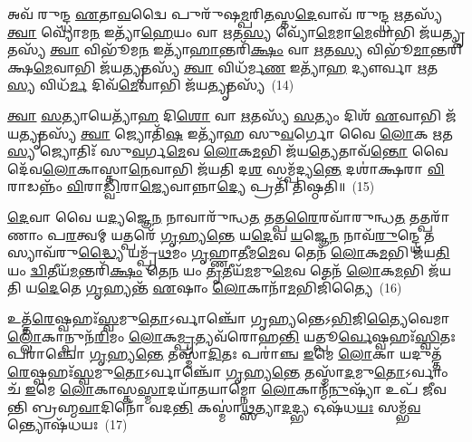 𑌅𑌵᳴ 𑌰𑍁𑌨𑍍𑌦𑍍𑌧 \ul{𑌏}\-𑌤𑌾\-\ul{𑌵}\-𑌦𑍍𑌵𑍈 𑌪𑍁𑌰𑍁᳴𑌷\-\ul{𑌮𑍍𑌪}\-𑌰𑌿\-\ul{𑌤}\-𑌸𑍍𑌤\-\ul{𑌦𑍇}\-𑌵𑌾𑌵᳴ 𑌰𑍁𑌨𑍍𑌦𑍍𑌧 \ul{𑌋}\-𑌤𑌸𑍍𑌯᳴ \ul{𑌤𑍍𑌵𑌾} 𑌵𑍍𑌯𑍋᳴𑌮\-\ul{𑌨} 𑌇𑌤𑍍𑌯𑌾᳴\-\ul{𑌹𑍇}\-𑌯𑌂 𑌵𑌾 \ul{𑌋}\-𑌤\-\ul{𑌸𑍍𑌯} 𑌵𑍍𑌯𑍋᳴\-\ul{𑌮𑍇}\-𑌮𑌾\-\ul{𑌮𑍇}\-𑌵𑌾𑌭𑌿 𑌜᳴𑌯\-\ul{𑌤𑍍𑌯𑍃}\-𑌤𑌸𑍍𑌯᳴ \ul{𑌤𑍍𑌵𑌾} 𑌵𑌿𑌭𑍂᳴𑌮\-\ul{𑌨} 𑌇𑌤𑍍𑌯𑌾᳴\-\ul{𑌹𑌾}\-𑌨𑍍𑌤𑌰𑌿᳴\-\ul{𑌕𑍍𑌷𑌂} 𑌵𑌾 \ul{𑌋}\-𑌤\-\ul{𑌸𑍍𑌯} 𑌵𑌿𑌭𑍂᳴\-\ul{𑌮𑌾}\-𑌨𑍍𑌤𑌰𑌿᳴𑌕𑍍𑌷\-\ul{𑌮𑍇}\-𑌵𑌾𑌭𑌿 𑌜᳴𑌯\-\ul{𑌤𑍍𑌯𑍃}\-𑌤𑌸𑍍𑌯᳴ \ul{𑌤𑍍𑌵𑌾} 𑌵𑌿𑌧᳴𑌰𑍍𑌮\-\ul{𑌣} 𑌇𑌤𑍍𑌯𑌾᳴\-\ul{𑌹} 𑌦𑍍𑌯𑍗𑌰𑍍𑌵𑌾 \ul{𑌋}\-𑌤\-\ul{𑌸𑍍𑌯} 𑌵𑌿𑌧᳴\-\ul{𑌰𑍍𑌮} 𑌦𑌿𑌵᳴\-\ul{𑌮𑍇}\-𑌵𑌾𑌭𑌿 𑌜᳴𑌯\-\ul{𑌤𑍍𑌯𑍃}\-𑌤𑌸𑍍𑌯᳴~(14)

\-\ul{𑌤𑍍𑌵𑌾} \ul{𑌸}\-𑌤𑍍𑌯𑌾𑌯𑍇𑌤𑍍𑌯𑌾᳴\-\ul{𑌹} 𑌦𑌿\-\ul{𑌶𑍋} 𑌵𑌾 \ul{𑌋}\-𑌤𑌸𑍍𑌯᳴ \ul{𑌸}\-𑌤𑍍𑌯𑌂 𑌦𑌿𑌶᳴ \ul{𑌏}\-𑌵𑌾𑌭𑌿 𑌜᳴𑌯\-\ul{𑌤𑍍𑌯𑍃}\-𑌤𑌸𑍍𑌯᳴ \ul{𑌤𑍍𑌵𑌾} 𑌜𑍍𑌯𑍋𑌤𑌿᳴\-\ul{𑌷} 𑌇𑌤𑍍𑌯𑌾᳴𑌹 𑌸𑍁\-\ul{𑌵}\-𑌰𑍍𑌗𑍋 𑌵𑍈 \ul{𑌲𑍋}\-𑌕 \ul{𑌋}\-𑌤\-\ul{𑌸𑍍𑌯} 𑌜𑍍𑌯𑍋𑌤𑌿𑌃᳴ 𑌸𑍁\-\ul{𑌵}\-𑌰𑍍𑌗\-\ul{𑌮𑍇}\-𑌵 \ul{𑌲𑍋}\-𑌕\-\ul{𑌮}\-𑌭𑌿 𑌜᳴𑌯\-\ul{𑌤𑍍𑌯𑍇}\-𑌤𑌾𑌵᳴\-\ul{𑌨𑍍𑌤𑍋} 𑌵𑍈 𑌦𑍇᳴𑌵\-\ul{𑌲𑍋}\-𑌕𑌾𑌸𑍍𑌤𑌾\-\ul{𑌨𑍇}\-𑌵𑌾𑌭𑌿 𑌜᳴𑌯𑌤𑌿 𑌦\-\ul{𑌶} 𑌸𑌮𑍍𑌪᳴𑌦𑍍𑌯\-\ul{𑌨𑍍𑌤𑍇} 𑌦𑌶𑌾॑𑌕𑍍𑌷𑌰𑌾 \ul{𑌵𑌿}\-𑌰𑌾𑌡𑌨𑍍𑌨𑌂᳴ \ul{𑌵𑌿}\-𑌰𑌾\-\ul{𑌡𑍍𑌵𑌿}\-𑌰𑌾\-\ul{𑌜𑍍𑌯𑍇}\-𑌵𑌾𑌨𑍍𑌨𑌾\-\ul{𑌦𑍍𑌯𑍇} 𑌪𑍍𑌰𑌤𑌿᳴ 𑌤𑌿𑌷𑍍𑌠𑌤𑌿॥~(15)

{\anuvakamend[{𑌵𑍍𑌯𑍋᳴𑌮𑌨 \ul{𑌋}\-𑌤𑌸𑍍𑌯᳴ \ul{𑌪𑍍𑌰𑌾}\-𑌣𑌃 \ul{𑌪}\-𑌶𑍂\-\ul{𑌨𑍇}\-𑌵 𑌵𑌿𑌧᳴\-\ul{𑌰𑍍𑌮} 𑌦𑌿𑌵᳴\-\ul{𑌮𑍇}\-𑌵𑌾𑌭𑌿 𑌜᳴𑌯\-\ul{𑌤𑍍𑌯𑍃}\-𑌤\-\ul{𑌸𑍍𑌯} 𑌷𑌟𑍍𑌚᳴𑌤𑍍𑌵𑌾𑌰𑌿𑍞𑌶𑌚𑍍𑌚}]}%

\-\ul{𑌦𑍇}\-𑌵𑌾 𑌵𑍈 𑌯\-\ul{𑌦𑍍𑌯}\-𑌜𑍍𑌞𑍇\-\ul{𑌨} 𑌨𑌾𑌵𑌾𑌰𑍁᳴𑌨𑍍𑌧\-\ul{𑌤} 𑌤𑌤𑍍𑌪\-\ul{𑌰𑍈}\-𑌰𑌵𑌾᳴𑌰𑍁𑌨𑍍𑌧\-\ul{𑌤} 𑌤𑌤𑍍𑌪𑌰𑌾᳴𑌣𑌾𑌂 𑌪\-\ul{𑌰}\-𑌤𑍍𑌵𑌮𑍍 𑌯𑌤𑍍𑌪𑌰𑍇᳴ \ul{𑌗𑍃}\-𑌹𑍍𑌯\-\ul{𑌨𑍍𑌤𑍇} 𑌯\-\ul{𑌦𑍇}\-𑌵 \ul{𑌯}\-𑌜𑍍𑌞𑍇\-\ul{𑌨} 𑌨𑌾𑌵᳴\-\ul{𑌰𑍁}\-𑌨𑍍𑌦𑍍𑌧𑍇 𑌤𑌸𑍍𑌯𑌾𑌵᳴𑌰𑍁\-\ul{𑌦𑍍𑌧𑍍𑌯𑍈} 𑌯𑌮𑍍𑌪𑍍𑌰᳴\-\ul{𑌥}\-𑌮𑌂 \ul{𑌗𑍃}\-𑌹𑍍𑌣𑌾\-\ul{𑌤𑍀}\-𑌮\-\ul{𑌮𑍇}\-𑌵 𑌤𑍇𑌨᳴ \ul{𑌲𑍋}\-𑌕\-\ul{𑌮}\-𑌭𑌿 𑌜᳴𑌯\-\ul{𑌤𑌿} 𑌯𑌂 \ul{𑌦𑍍𑌵𑌿}\-𑌤𑍀𑌯᳴\-\ul{𑌮}\-𑌨𑍍𑌤𑌰𑌿᳴\-\ul{𑌕𑍍𑌷𑌂} 𑌤𑍇\-\ul{𑌨} 𑌯𑌂 \ul{𑌤𑍃}\-𑌤𑍀𑌯᳴\-\ul{𑌮}\-𑌮𑍁\-\ul{𑌮𑍇}\-𑌵 𑌤𑍇𑌨᳴ \ul{𑌲𑍋}\-𑌕\-\ul{𑌮}\-𑌭𑌿 𑌜᳴𑌯𑌤𑌿 𑌯\-\ul{𑌦𑍇}\-𑌤𑍇 \ul{𑌗𑍃}\-𑌹𑍍𑌯𑌨𑍍𑌤᳴ \ul{𑌏}\-𑌷𑌾𑌂 \ul{𑌲𑍋}\-𑌕𑌾𑌨𑌾᳴\-\ul{𑌮}\-𑌭𑌿𑌜𑌿᳴𑌤𑍍𑌯𑍈~(16)

𑌉𑌤𑍍𑌤᳴\-\ul{𑌰𑍇}\-𑌷𑍍𑌵𑌹𑌃᳴\-\ul{𑌸𑍍𑌵}\-𑌮𑍁\-\ul{𑌤𑍋}\-\-𑌽𑌰𑍍𑌵𑌾𑌞𑍍𑌚𑍋᳴ 𑌗𑍃𑌹𑍍𑌯𑌨𑍍𑌤𑍇\-𑌽\-\ul{𑌭𑌿}\-𑌜𑌿\-\ul{𑌤𑍍𑌯𑍈}\-𑌵𑍇𑌮𑌾\-\ul{𑌲𑍍𑌲𑍋𑌁}\-𑌕𑌾𑌨𑍍𑌪𑍁𑌨᳴\-\ul{𑌰𑌿}\-𑌮𑌂 \ul{𑌲𑍋}\-𑌕\-\ul{𑌮𑍍𑌪𑍍𑌰}\-𑌤𑍍𑌯𑌵᳴𑌰𑍋𑌹\-\ul{𑌨𑍍𑌤𑌿} 𑌯𑌤𑍍𑌪𑍂\-\ul{𑌰𑍍𑌵𑍇}\-𑌷𑍍𑌵𑌹𑌃᳴\-\ul{𑌸𑍍𑌵𑌿}\-𑌤𑌃 𑌪𑌰𑌾॑𑌞𑍍𑌚𑍋 \ul{𑌗𑍃}\-𑌹𑍍𑌯\-\ul{𑌨𑍍𑌤𑍇} 𑌤𑌸𑍍𑌮𑌾᳴\-\ul{𑌦𑌿}\-𑌤𑌃 𑌪𑌰𑌾॑𑌞𑍍𑌚 \ul{𑌇}\-𑌮𑍇 \ul{𑌲𑍋}\-𑌕𑌾 𑌯𑌦𑍁𑌤𑍍𑌤᳴\-\ul{𑌰𑍇}\-𑌷𑍍𑌵𑌹𑌃᳴\-\ul{𑌸𑍍𑌵}\-𑌮𑍁\-\ul{𑌤𑍋}\-\-𑌽𑌰𑍍𑌵𑌾𑌞𑍍𑌚𑍋᳴ \ul{𑌗𑍃}\-𑌹𑍍𑌯\-\ul{𑌨𑍍𑌤𑍇} 𑌤𑌸𑍍𑌮𑌾᳴\-\ul{𑌦}\-𑌮𑍁\-\ul{𑌤𑍋}\-\-𑌽𑌰𑍍𑌵𑌾𑌂 𑌚᳴ \ul{𑌇}\-𑌮𑍇 \ul{𑌲𑍋}\-𑌕𑌾𑌸𑍍𑌤\-\ul{𑌸𑍍𑌮𑌾}\-𑌦\-𑌯𑌾᳴𑌤𑌯𑌾𑌮𑍍𑌨𑍋 \ul{𑌲𑍋}\-𑌕𑌾𑌨𑍍𑌮᳴\-\ul{𑌨𑍁}\-𑌷𑍍𑌯𑌾᳴ 𑌉𑌪᳴ 𑌜𑍀𑌵𑌨𑍍𑌤𑌿 𑌬𑍍𑌰𑌹𑍍𑌮\-\ul{𑌵𑌾}\-𑌦𑌿𑌨𑍋᳴ 𑌵𑌦\-\ul{𑌨𑍍𑌤𑌿} 𑌕𑌸𑍍𑌮𑌾॑\-\ul{𑌥𑍍𑌸}\-𑌤𑍍𑌯𑌾\-\ul{𑌦}\-𑌦𑍍𑌭𑍍𑌯 𑌓𑌷᳴𑌧\-\ul{𑌯𑌃} 𑌸𑌮𑍍𑌭᳴\-\ul{𑌵}\-𑌨𑍍𑌤𑍍𑌯𑍋𑌷᳴𑌧𑌯𑌃~(17)

